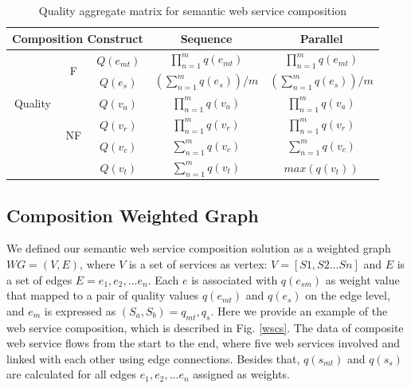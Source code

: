 \documentclass{IEEEtran}
\begin{document}
\begin{table}[]
\centering
\caption{Quality aggregate matrix for semantic web service composition}
\label{table1}
\begin{tabular}{c|c|c|c|c}
\hline
\multicolumn{3}{c|}{Composition Construct}                                      & Sequence                             & Parallel \\ \hline
\multirow{5}{*}{Quality} & \multirow{2}{*}{F}    & $Q(e_ {mt})$  &$\prod_{n=1}^{m} q(e_ {mt})$          &  $\prod_{n=1}^{m} q(e_ {mt})$ \\ \cline{3-5}
                                &                                & $Q(e_ {s})$  & $(\sum_{n=1}^m q(e_ {s}))/m$        &  $(\sum_{n=1}^m q(e_ {s}))/m$  \\ \cline{2-5}   
                                & \multirow{4}{*}{NF} & $Q(v_{a})$    & $\prod_{n=1}^{m} q(v_a)$             &  $\prod_{n=1}^{m} q(v_a)$ \\ \cline{3-5} 
                                &                                & $Q(v_{r})$    & $\prod_{n=1}^{m} q(v_r)$             &  $\prod_{n=1}^{m} q(v_r)$ \\ \cline{3-5} 
                                &                                & $Q(v_{c})$    & $\sum_{n=1}^m q(v_ {c})$             &  $\sum_{n=1}^m q(v_ {c})$ \\ \cline{3-5} 
                                &                                & $Q(v_{t})$    & $\sum_{n=1}^m q(v_ {t})$             &  $max(q(v_ {t}))$ \\ \hline
\end{tabular}
\end{table}



\subsection{Composition Weighted Graph}
We defined our semantic web service composition solution as a weighted graph $WG = (V, E)$, where $V$ is a set of services as vertex: $V=[S1, S2...Sn]$ and $E$ is a set of edges $E = {e_{1}, e_{2},... e_{n}}$. Each $e$ is associated with $q(e_{sm})$ as weight value that mapped to a pair of quality values $q(e_{mt})$ and $q(e_{s})$ on the edge level, and $e_{m}$ is expressed as $(S_{a},S_{b})={q_{mt}, q_{s}}$. Here we provide an example of the web service composition, which is described in Fig. \ref{wscs}. The data of composite web service flows from the start to the end, where five web services involved and linked with each other using edge connections. Besides that, $q(s_{mt})$ and $q(s_{s})$ are calculated for all edges ${e_{1}, e_{2},... e_{n}}$ assigned as weights.
\end{document}
